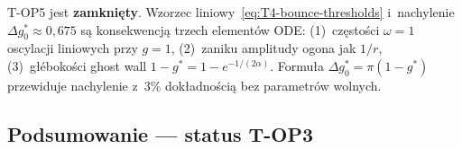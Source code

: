 \begin{observation}\label{obs:T4-top5-closed}
T-OP5 jest \textbf{zamkni\k{e}ty}.
Wzorzec liniowy~\eqref{eq:T4-bounce-thresholds} i~nachylenie
$\Delta g_0^* \approx 0{,}675$ s\k{a} konsekwencj\k{a} trzech elementów ODE:
(1)~cz\k{e}sto\'sci $\omega=1$ oscylacji liniowych przy $g=1$,
(2)~zaniku amplitudy ogona jak $1/r$,
(3)~g\l{}\'eboko\'sci ghost wall $1-g^* = 1-e^{-1/(2\alpha)}$.
Formu\l{}a $\Delta g_0^* = \pi(1-g^*)$ przewiduje nachylenie z~$3\%$
dok\l{}adno\'sci\k{a} bez parametr\'ow wolnych.
\end{observation}

\subsection{Podsumowanie --- status T-OP3}
\label{app:T4-summary}


